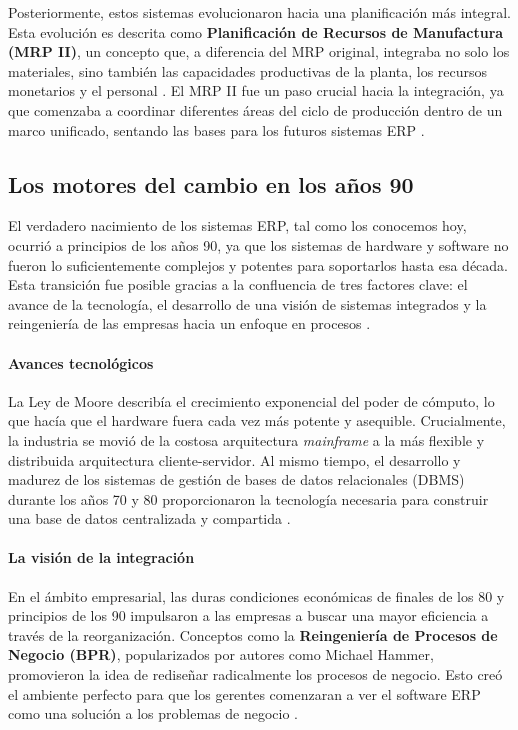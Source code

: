 \documentclass[12pt,letterpaper,spanish]{report}
\begin{document}
Posteriormente, estos sistemas evolucionaron hacia una planificación más integral. Esta evolución es descrita como \textbf{Planificación de Recursos de Manufactura (MRP II)}, un concepto que, a diferencia del MRP original, integraba no solo los materiales, sino también las capacidades productivas de la planta, los recursos monetarios y el personal \citep{Miño-Cascante_Saumell-Fonseca_Toledo-Borrego_Roldan-Ruenes_Moreno-García_2015}. El MRP II fue un paso crucial hacia la integración, ya que comenzaba a coordinar diferentes áreas del ciclo de producción dentro de un marco unificado, sentando las bases para los futuros sistemas ERP \citep{Miño-Cascante_Saumell-Fonseca_Toledo-Borrego_Roldan-Ruenes_Moreno-García_2015}.


\subsection{Los motores del cambio en los años 90}
El verdadero nacimiento de los sistemas ERP, tal como los conocemos hoy, ocurrió a principios de los años 90, ya que los sistemas de hardware y software no fueron lo suficientemente complejos y potentes para soportarlos hasta esa década. Esta transición fue posible gracias a la confluencia de tres factores clave: el avance de la tecnología, el desarrollo de una visión de sistemas integrados y la reingeniería de las empresas hacia un enfoque en procesos \cite{book}.

\paragraph{Avances tecnológicos} La Ley de Moore describía el crecimiento exponencial del poder de cómputo, lo que hacía que el hardware fuera cada vez más potente y asequible. Crucialmente, la industria se movió de la costosa arquitectura \textit{mainframe} a la más flexible y distribuida arquitectura cliente-servidor. Al mismo tiempo, el desarrollo y madurez de los sistemas de gestión de bases de datos relacionales (DBMS) durante los años 70 y 80 proporcionaron la tecnología necesaria para construir una base de datos centralizada y compartida \cite{book}.

\paragraph{La visión de la integración} En el ámbito empresarial, las duras condiciones económicas de finales de los 80 y principios de los 90 impulsaron a las empresas a buscar una mayor eficiencia a través de la reorganización. Conceptos como la \textbf{Reingeniería de Procesos de Negocio (BPR)}, popularizados por autores como Michael Hammer, promovieron la idea de rediseñar radicalmente los procesos de negocio. Esto creó el ambiente perfecto para que los gerentes comenzaran a ver el software ERP como una solución a los problemas de negocio \cite{book}.
\end{document}

